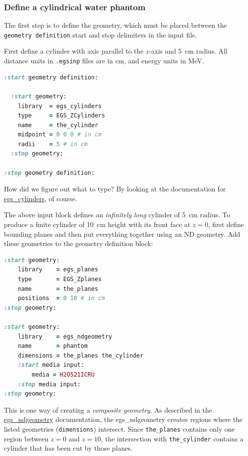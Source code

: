 \documentclass[12pt,twoside]{article}
\begin{document}
\subsubsection{Define a cylindrical water phantom}

The first step is to define the geometry, which must be placed between the \\
\Verb+geometry definition+ start and stop delimiters in the input file.

First define a cylinder with axis parallel to the $z\!$-axis and 5~cm radius. All distance units in \Verb+.egsinp+ files are in cm, and energy units in MeV.
\vspace{2ex}
\begin{lstlisting}[language=ruby,backgroundcolor=\color{white}]
:start geometry definition:

  :start geometry:
    library  = egs_cylinders
    type     = EGS_ZCylinders
    name     = the_cylinder
    midpoint = 0 0 0 # in cm
    radii    = 5 # in cm
  :stop geometry:

:stop geometry definition:
\end{lstlisting}
\vspace{1ex}

How did we figure out what to type? By looking at the documentation for \href{http://nrc-cnrc.github.io/EGSnrc/doc/pirs898/classEGS__CylindersT.html}{egs\_cylinders}, of course.

The above input block defines an \textit{infinitely long} cylinder of 5~cm radius. To
produce a finite cylinder of 10~cm height with its front face at $z=0$, first
define bounding planes and then put everything together using an ND geometry.
Add these geometries to the geometry definition block:
\vspace{3ex}
\begin{lstlisting}[language=ruby,backgroundcolor=\color{white}]
:start geometry:
    library    = egs_planes
    type       = EGS_Zplanes
    name       = the_planes
    positions  = 0 10 # in cm
:stop geometry:

:start geometry:
    library    = egs_ndgeometry
    name       = phantom
    dimensions = the_planes the_cylinder
    :start media input:
        media = H2O521ICRU
    :stop media input:
:stop geometry:
\end{lstlisting}
\vspace{1ex}

This is one way of creating a \textit{composite geometry}. As described in the \href{http://nrc-cnrc.github.io/EGSnrc/doc/pirs898/classEGS__NDGeometry.html}{egs\_ndgeometry} documentation, the egs\_ndgeometry creates regions where the listed geometries (\Verb+dimensions+) intersect. Since \Verb+the_planes+ contains only one region between $z=0$ and $z=10$, the intersection with \Verb+the_cylinder+ contains a cylinder that has been cut by those planes.
\end{document}
